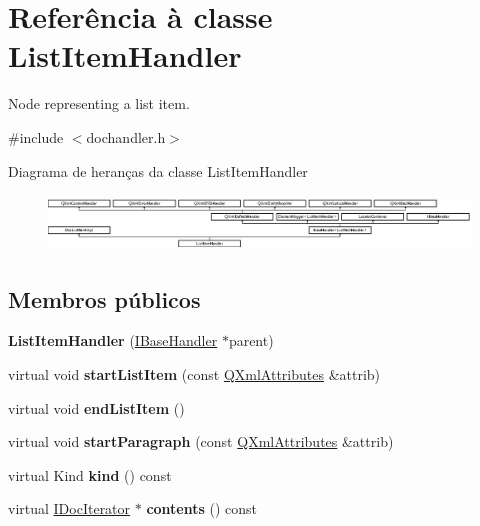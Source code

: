 \hypertarget{class_list_item_handler}{\section{Referência à classe List\-Item\-Handler}
\label{class_list_item_handler}
}


Node representing a list item.  




{\ttfamily \#include $<$dochandler.\-h$>$}

Diagrama de heranças da classe List\-Item\-Handler\begin{figure}[H]
\begin{center}
\leavevmode
\includegraphics[height=1.467890cm]{class_list_item_handler}
\end{center}
\end{figure}
\subsection*{Membros públicos}
\begin{DoxyCompactItemize}
\item 
\hypertarget{class_list_item_handler_a6fd8923a8e3f8acc6c439f615e3659c9}{{\bfseries List\-Item\-Handler} (\hyperlink{class_i_base_handler}{I\-Base\-Handler} $\ast$parent)}\label{class_list_item_handler_a6fd8923a8e3f8acc6c439f615e3659c9}

\item 
\hypertarget{class_list_item_handler_a1d5575fc3ee8b524bd469a184fe15b05}{virtual void {\bfseries start\-List\-Item} (const \hyperlink{class_q_xml_attributes}{Q\-Xml\-Attributes} \&attrib)}\label{class_list_item_handler_a1d5575fc3ee8b524bd469a184fe15b05}

\item 
\hypertarget{class_list_item_handler_aa72b7b349a306308193cb0a90710041d}{virtual void {\bfseries end\-List\-Item} ()}\label{class_list_item_handler_aa72b7b349a306308193cb0a90710041d}

\item 
\hypertarget{class_list_item_handler_abb7f955561480002949ada58092c1964}{virtual void {\bfseries start\-Paragraph} (const \hyperlink{class_q_xml_attributes}{Q\-Xml\-Attributes} \&attrib)}\label{class_list_item_handler_abb7f955561480002949ada58092c1964}

\item 
\hypertarget{class_list_item_handler_af8e62c8a81ddf2283205cc8955de50eb}{virtual Kind {\bfseries kind} () const }\label{class_list_item_handler_af8e62c8a81ddf2283205cc8955de50eb}

\item 
\hypertarget{class_list_item_handler_a6f867db5d47aa2210c77df9bc5953008}{virtual \hyperlink{class_i_doc_iterator}{I\-Doc\-Iterator} $\ast$ {\bfseries contents} () const }\label{class_list_item_handler_a6f867db5d47aa2210c77df9bc5953008}

\end{DoxyCompactItemize}

